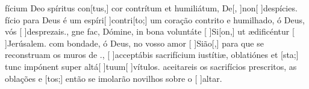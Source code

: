 {  {fícium Deo spíritus con[tus,] cor contrítum et humiliátum, De[, ]{non}[ ]{de}{spíci}es.}%
    {fício para Deus é um espíri[ ]{con}{tri}[to;] um coração contrito e humilhado, ó Deus, vós [ ]{des}{pre}{zais}.},
  {gne fac, Dómine, in bona voluntáte [ ]{Si}[on,] ut ædificéntur [ ]{Je}{rúsa}lem.}%
    { com bondade, ó Deus, no vosso amor [ ]{Si}{ão}[,] para que se reconstruam os muros de .},
  {[ ]{ac}ceptábis sacrifícium iustítiæ, oblatiónes et [\-sta;] tunc impónent super altá[ ]{tu}{um}[ ]{vítu}\-los.}%
    { aceitareis os sacrifícios prescritos, as oblações e [tos;] então se imolarão novilhos sobre o [ ]{al}{tar}.}
}